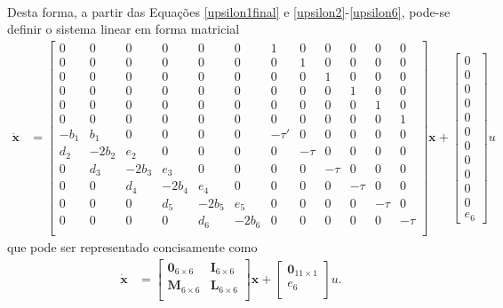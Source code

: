 \paragraph{} Desta forma, a partir das Equações \ref{upsilon1final} e \ref{upsilon2}-\ref{upsilon6}, pode-se definir o sistema linear em forma matricial \begin{align}
 	\mathbf{\dot{x}} &= \left[\begin{array}{cccccccccccc}
 		0 & 0 & 0 & 0 & 0 & 0 & 1 & 0 & 0 & 0 & 0 & 0\\
 		0 & 0 & 0 & 0 & 0 & 0 & 0 & 1 & 0 & 0 & 0 & 0\\
 		0 & 0 & 0 & 0 & 0 & 0 & 0 & 0 & 1 & 0 & 0 & 0\\
 		0 & 0 & 0 & 0 & 0 & 0 & 0 & 0 & 0 & 1 & 0 & 0\\
 		0 & 0 & 0 & 0 & 0 & 0 & 0 & 0 & 0 & 0 & 1 & 0\\
 		0 & 0 & 0 & 0 & 0 & 0 & 0 & 0 & 0 & 0 & 0 & 1\\
 		-b_1 & b_1 & 0 & 0 & 0 & 0 & -\tau' & 0     & 0 & 0 & 0 & 0\\
 		d_2 & -2b_2  & e_2  & 0  & 0 & 0 &  0    & -\tau & 0 & 0 & 0 & 0\\
 		0 & d_3 & -2b_3  & e_3  & 0  & 0 & 0 &  0    & -\tau & 0 & 0 & 0\\
 		0 & 0 & d_4 & -2b_4  & e_4  & 0  & 0 & 0 &  0    & -\tau & 0 & 0\\
 		0 & 0 & 0 & d_5 & -2b_5  & e_5  & 0  & 0 & 0 &  0    & -\tau & 0\\
 		0 & 0 & 0 & 0 & d_6 & -2b_6  & 0  & 0 & 0 &  0    & 0   &-\tau\\
 	\end{array}\right]\mathbf{x} + \left[\begin{array}{c}
	0\\	0\\	0\\	0\\	0\\ 0\\ 0\\ 0\\ 0\\ 0\\ 0\\ e_6
\end{array}
\right]u
 \end{align} que pode ser representado concisamente como \begin{align}
 	\mathbf{\dot{x}} &= \left[\begin{array}{cc}
	\mathbf{0}_{6\times 6} & \mathbf{I}_{6\times 6}\\
	\mathbf{M}_{6\times 6} & \mathbf{L}_{6\times 6}\\
\end{array}\right] \mathbf{x} + \left[\begin{array}{c}
	\mathbf{0}_{11\times 1}\\ e_6\\
\end{array} \right]u.
 \end{align}

